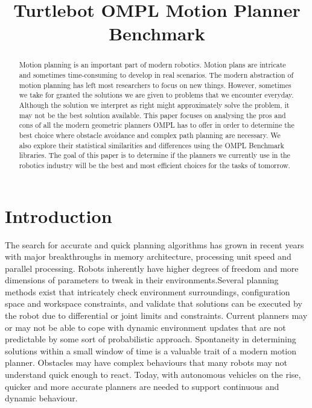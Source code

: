 \documentclass[conference]{IEEEtran} \usepackage[T1]{fontenc} \usepackage[backend=biber, style=ieee]{biblatex}
\begin{document}
\title{Turtlebot OMPL Motion Planner Benchmark}

\author{
}

\maketitle

\begin{abstract}
Motion planning is an important part of modern robotics. Motion plans are intricate and sometimes time-consuming to develop in real scenarios.
The modern abstraction of motion planning has left most researchers to focus on new things. However, sometimes we take for granted the solutions
we are given to problems that we encounter everyday. Although the solution we interpret as right might approximately solve the problem, it may not 
be the best solution available. This paper focuses on analysing the pros and cons of all the modern geometric planners OMPL has to offer in order to
determine the best choice where obstacle avoidance and complex path planning are necessary. We also explore their statistical similarities and differences using the OMPL 
Benchmark libraries. 
The goal of this paper is to determine if the planners we currently use in the robotics industry will be the best and most efficient choices for the 
tasks of tomorrow.
\end{abstract}

\section{Introduction} \label{Introduction}

The search for accurate and quick planning algorithms has grown in recent years with major breakthroughs in memory architecture, processing unit speed and 
parallel processing. Robots inherently have higher degrees of freedom and more dimensions of parameters to tweak in their environments.Several planning methods exist that 
intricately check environment surroundings, configuration space and workspace constraints, and validate
that solutions can be executed by the robot due to differential or joint limits and constraints. Current planners may or may not be able to cope with dynamic environment 
updates that are not predictable by some sort of probabilistic approach. Spontaneity in determining solutions within a small window of time is a valuable trait of a 
modern motion planner. Obstacles may have complex behaviours that many robots may not understand quick enough to react. Today, with autonomous vehicles on the rise, 
quicker and more accurate planners are needed to support continuous and dynamic behaviour.
\end{document}
